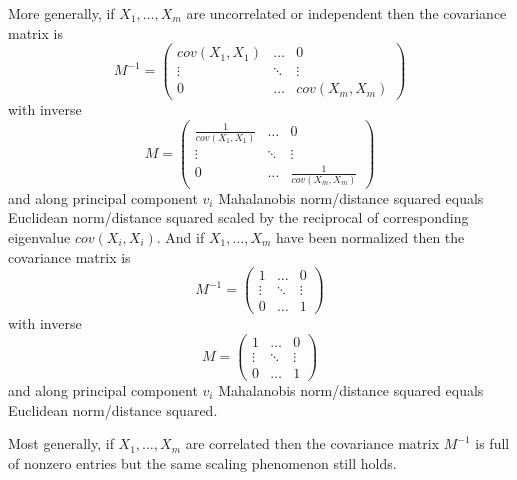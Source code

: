 \documentclass[11pt]{amsart}
\theoremstyle{definition}
\begin{document}
More generally, if $X_1, \dots , X_m$ are uncorrelated or independent then the covariance matrix is
$$M^{-1} = \left( \begin{array}{ccc} cov(X_1, X_1) & \dots & 0 \\ \vdots & \ddots & \vdots \\ 0 & \dots & cov(X_m, X_m) \end{array} \right)$$
with inverse
$$M = \left( \begin{array}{ccc} \frac{1}{cov(X_1, X_1)} & \dots & 0 \\ \vdots & \ddots & \vdots \\ 0 & \dots & \frac{1}{cov(X_m, X_m)} \end{array} \right)$$
and along principal component $v_i$ Mahalanobis norm/distance squared equals Euclidean norm/distance squared scaled by the reciprocal of corresponding eigenvalue $cov(X_i, X_i)$. And if $X_1, \dots , X_m$ have been normalized then the covariance matrix is
$$M^{-1} = \left( \begin{array}{ccc} 1 & \dots & 0 \\ \vdots & \ddots & \vdots \\ 0 & \dots & 1 \end{array} \right)$$
with inverse
$$M = \left( \begin{array}{ccc} 1 & \dots & 0 \\ \vdots & \ddots & \vdots \\ 0 & \dots & 1 \end{array} \right)$$
and along principal component $v_i$ Mahalanobis norm/distance squared equals Euclidean norm/distance squared.

Most generally, if $X_1, \dots , X_m$ are correlated then the covariance matrix $M^{-1}$ is full of nonzero entries but the same scaling phenomenon still holds.
\end{document}
